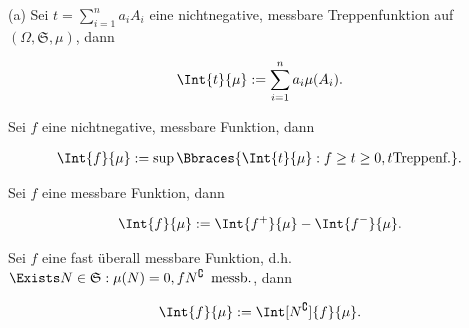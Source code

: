 \begin{solution}

(a) Sei $t = \sum_{i=1}^n a_i A_i$ eine nichtnegative, messbare Treppenfunktion auf $(\Omega, \mathfrak{S}, \mu)$, dann

\begin{align*}
  \Int{t}{\mu} := \sum_{i=1}^n a_i \mu(A_i).
\end{align*}

Sei $f$ eine nichtnegative, messbare Funktion, dann

\begin{align*}
  \Int{f}{\mu} := \sup \Bbraces{\Int{t}{\mu}: f \geq t \geq 0, t \text{Treppenf.}}.
\end{align*}

Sei $f$ eine messbare Funktion, dann

\begin{align*}
  \Int{f}{\mu} := \Int{f^+}{\mu} - \Int{f^-}{\mu}.
\end{align*}

Sei $f$ eine fast überall messbare Funktion, d.h. $\Exists N \in \mathfrak{S}: \mu(N) = 0, fN^\complement \enspace \text{messb.}$, dann

\begin{align*}
  \Int{f}{\mu} := \Int[N^\complement]{f}{\mu}.
\end{align*}

\end{solution}

